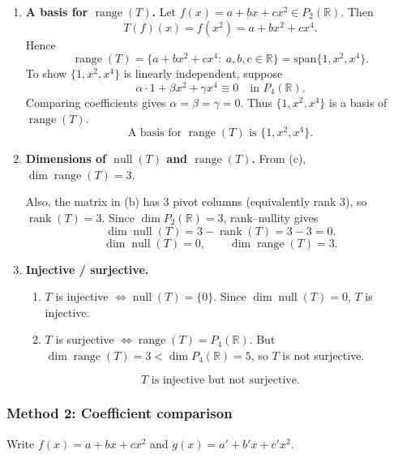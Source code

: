 \documentclass[12pt]{article}
\let\amsboxed\boxed
\renewcommand{\boxed}[1]{\amsboxed{\,#1\,}}
\begin{document}
\begin{enumerate}[label=(\alph*)]
\item \textbf{A basis for $\operatorname{range}(T)$.}
Let $f(x)=a+bx+cx^2\in P_2(\mathbb{R})$. Then
\[
T(f)(x)=f(x^2)=a+bx^2+cx^4.
\]
Hence
\[
\operatorname{range}(T)=\{a+bx^2+cx^4:\ a,b,c\in\mathbb{R}\}=\mathrm{span}\{1,x^2,x^4\}.
\]
To show $\{1,x^2,x^4\}$ is linearly independent, suppose
\[
\alpha\cdot 1+\beta x^2+\gamma x^4\equiv 0 \quad\text{in }P_4(\mathbb{R}).
\]
Comparing coefficients gives $\alpha=\beta=\gamma=0$. Thus $\{1,x^2,x^4\}$ is a basis of $\operatorname{range}(T)$.
\[
\boxed{\,\text{A basis for }\operatorname{range}(T)\text{ is }\{1,x^2,x^4\}.\,}
\]

\item \textbf{Dimensions of $\operatorname{null}(T)$ and $\operatorname{range}(T)$.}
From (c), $\dim\operatorname{range}(T)=3$.

Also, the matrix in (b) has $3$ pivot columns (equivalently rank $3$), so $\operatorname{rank}(T)=3$.
Since $\dim P_2(\mathbb{R})=3$, rank--nullity gives
\[
\dim\operatorname{null}(T)=3-\operatorname{rank}(T)=3-3=0.
\]
\[
\boxed{\,\dim\operatorname{null}(T)=0,\qquad \dim\operatorname{range}(T)=3.\,}
\]

\item \textbf{Injective / surjective.}
\begin{enumerate}[label=(\roman*)]
\item $T$ is injective $\iff \operatorname{null}(T)=\{0\}$. Since $\dim\operatorname{null}(T)=0$, $T$ is injective.
\item $T$ is surjective $\iff \operatorname{range}(T)=P_4(\mathbb{R})$. But $\dim\operatorname{range}(T)=3<\dim P_4(\mathbb{R})=5$, so $T$ is not surjective.
\end{enumerate}
\[
\boxed{\,T\text{ is injective but not surjective.}\,}
\]
\end{enumerate}
\newpage
\subsubsection{Method 2: Coefficient comparison}
Write $f(x)=a+bx+cx^2$ and $g(x)=a'+b'x+c'x^2$.
\end{document}
